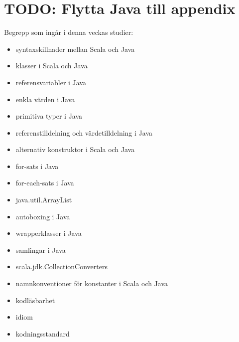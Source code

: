 \chapter{TODO: Flytta Java till appendix}\label{chapter:W11}
Begrepp som ingår i denna veckas studier:
\begin{itemize}[noitemsep,label={$\square$},leftmargin=*]
\item syntaxskillnader mellan Scala och Java
\item klasser i Scala och Java
\item referensvariabler i Java
\item enkla värden i Java
\item primitiva typer i Java
\item referenstilldelning och värdetilldelning i Java
\item alternativ konstruktor i Scala och Java
\item for-sats i Java
\item for-each-sats i Java
\item java.util.ArrayList
\item autoboxing i Java
\item wrapperklasser i Java
\item samlingar i Java
\item scala.jdk.CollectionConverters
\item namnkonventioner för konstanter i Scala och Java
\item kodläsbarhet
\item idiom
\item kodningsstandard\end{itemize}
